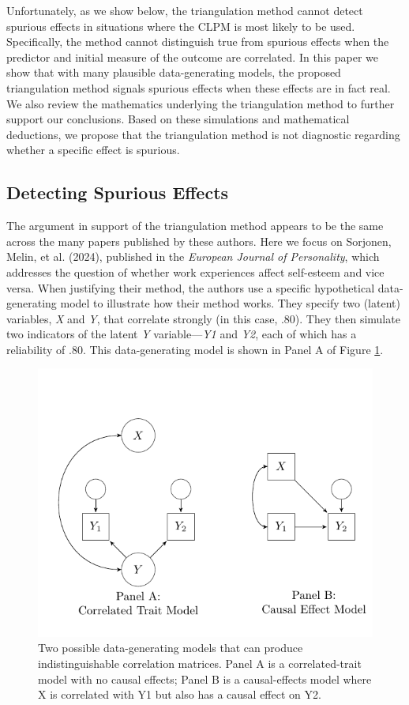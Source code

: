 \documentclass[
  man,mask,floatsintext]{apa6}
\begin{document}
Unfortunately, as we show below, the triangulation method cannot detect spurious effects in situations where the CLPM is most likely to be used. Specifically, the method cannot distinguish true from spurious effects when the predictor and initial measure of the outcome are correlated. In this paper we show that with many plausible data-generating models, the proposed triangulation method signals spurious effects when these effects are in fact real. We also review the mathematics underlying the triangulation method to further support our conclusions. Based on these simulations and mathematical deductions, we propose that the triangulation method is not diagnostic regarding whether a specific effect is spurious.

\subsection{Detecting Spurious Effects}\label{detecting-spurious-effects}

The argument in support of the triangulation method appears to be the same across the many papers published by these authors. Here we focus on Sorjonen, Melin, et al. (2024), published in the \emph{European Journal of Personality}, which addresses the question of whether work experiences affect self-esteem and vice versa. When justifying their method, the authors use a specific hypothetical data-generating model to illustrate how their method works. They specify two (latent) variables, \emph{X} and \emph{Y}, that correlate strongly (in this case, .80). They then simulate two indicators of the latent \emph{Y} variable---\emph{Y1} and \emph{Y2}, each of which has a reliability of .80. This data-generating model is shown in Panel A of Figure \ref{fig:dgm}.

\begin{figure}
\centering
\includegraphics{images/dgm.pdf}
\caption{\label{fig:dgm}Two possible data-generating models that can produce indistinguishable correlation matrices. Panel A is a correlated-trait model with no causal effects; Panel B is a causal-effects model where X is correlated with Y1 but also has a causal effect on Y2.}
\end{figure}
\end{document}
